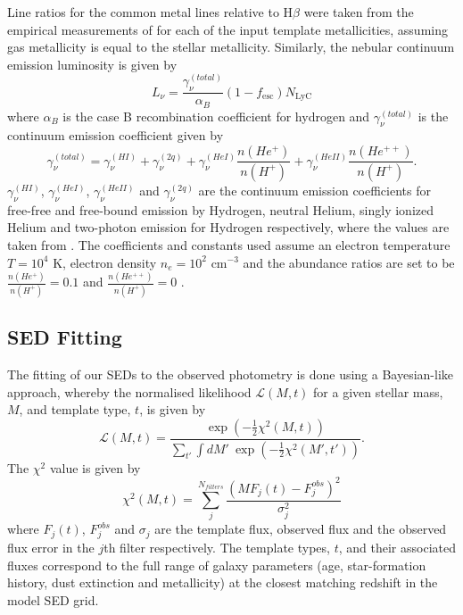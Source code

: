 Line ratios for the common metal lines relative to H$\beta$ were taken from the empirical measurements of \cite{Anders:2003ci} for each of the input template metallicities, assuming gas metallicity is equal to the stellar metallicity.
Similarly, the nebular continuum emission luminosity is given by
\begin{equation}
\label{eq:continuum}
L_{\nu} = \frac{\gamma^{(total)}_{\nu}} {\alpha_{B}}(1-f_{\text{esc}}) N_{\text{LyC}}
\end{equation}
where $\alpha_{B}$ is the case B recombination coefficient for hydrogen and $\gamma^{(total)}_{\nu}$ is the continuum emission coefficient given by
\begin{equation}\label{eq:cont_sep}
\gamma^{(total)}_{\nu} = \gamma^{(HI)}_{\nu} + \gamma^{(2q)}_{\nu} +  \gamma^{(HeI)}_{\nu}\frac{n(He^{+})} {n(H^{+})} + \gamma^{(HeII)}_{\nu}\frac{n(He^{++})} {n(H^{+})}
.\end{equation}
$\gamma^{(HI)}_{\nu}$, $\gamma^{(HeI)}_{\nu}$, $\gamma^{(HeII)}_{\nu}$ and $\gamma^{(2q)}_{\nu}$ are the continuum emission coefficients for free-free and free-bound emission by Hydrogen, neutral Helium, singly ionized Helium and two-photon emission for Hydrogen respectively, where the values are taken from \cite{Osterbrock:2006ul}. The coefficients and constants used assume an electron temperature $T=10^4$ K, electron density $n_{e}=10^2$ cm$^{-3}$ and the abundance ratios are set to be $\frac{n(He^{+})} {n(H^{+})} = 0.1$ and $\frac{n(He^{++})} {n(H^{+})} = 0$ \citep{1995A&A...303...41K}.

\subsection{SED Fitting}
The fitting of our SEDs to the observed photometry is done using a Bayesian-like approach, whereby the normalised likelihood $\mathcal{L}(M,t)$ for a given stellar mass, $M$, and template type, $t$, is given by
\begin{equation}
 \mathcal{L}(M,t) = \frac{\exp(-\tfrac{1}{2}\chi^{2}(M,t))}
          {\sum_{t'} \int dM' ~ \exp(-\tfrac{1}{2}\chi^{2}(M',t'))}.
\end{equation}
The $\chi^2$ value is given by
\begin{equation}
  \chi^{2}(M,t) = \sum_{j}^{N_{filters}} \frac{(M F_{j}(t) - F_{j}^{obs})^2} {\sigma_{j}^{2}}
\end{equation}
where $F_{j}(t)$, $F_{j}^{obs}$ and $\sigma_{j}$ are the template flux, observed flux and the observed flux error in the $j$th filter respectively. The template types, $t$, and their associated fluxes correspond to the full range of galaxy parameters (age, star-formation history, dust extinction and metallicity) at the closest matching redshift in the model SED grid.

